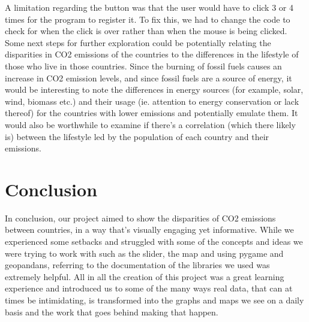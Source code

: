 \documentclass[fontsize=11pt]{article}
\begin{document}
A limitation regarding the button was that the user would have to click 3 or 4 times for the program to register it. To fix this, we had to change the code to check for when the click is over rather than when the mouse is being clicked. 
Some next steps for further exploration could be potentially relating the disparities in CO2 emissions of the countries to the differences in the lifestyle of those who live in those countries. Since the burning of fossil fuels causes an increase in CO2 emission levels, and since fossil fuels are a source of energy, it would be interesting to note the differences in energy sources (for example, solar, wind, biomass etc.) and their usage (ie. attention to energy conservation or lack thereof) for the countries with lower emissions and potentially emulate them. It would also be worthwhile to examine if there’s a correlation (which there likely is) between the lifestyle led by the population of each country and their emissions. 

\section*{Conclusion}
In conclusion, our project aimed to show the disparities of CO2 emissions between countries, in a way that’s visually engaging yet informative. While we experienced some setbacks and struggled with some of the concepts and ideas we were trying to work with such as the slider, the map and using pygame and geopandans, referring to the documentation of the libraries we used was extremely helpful. All in all the creation of this project was a great learning experience and introduced us to some of the many ways real data, that can at times be intimidating,  is transformed into the graphs and maps we see on a daily basis and the work that goes behind making that happen. 
\end{document}
